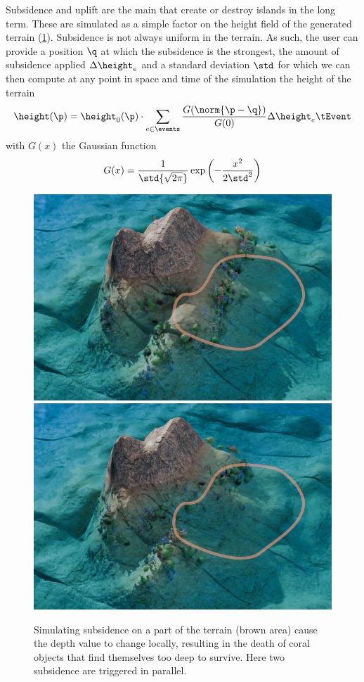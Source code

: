 Subsidence and uplift are the main  that create or destroy islands in the long term. These  are simulated as a simple factor on the height field of the generated terrain (\cref{fig:semantic-representation_subsidence-event}). Subsidence is not always uniform in the terrain. As such, the user can provide a position $\q$ at which the subsidence is the strongest, the amount of subsidence applied $\Delta \height_e$ and a standard deviation $\std$ for which we can then compute at any point in space and time of the simulation the height of the terrain
\begin{align*}
    \height(\p) = \height_0(\p) \cdot \sum_{e \in \events}{\frac{G(\norm{\p - \q})}{G(0)}} \Delta \height_e \tEvent 
\end{align*}
with $G(x)$ the Gaussian function
\begin{align*}
    G(x) = {\frac {1}{\std {\sqrt {2\pi }}}} \exp \left(-\frac {x^{2}}{2 \std ^{2}}\right)
\end{align*}

\begin{figure}
    \includegraphics[width = 0.45 \linewidth]{Figures/Interactions/InteractionSubsidence1.png}
    \includegraphics[width = 0.45 \linewidth]{Figures/Interactions/InteractionSubsidence2.png}
    \caption{Simulating subsidence on a part of the terrain (brown area) cause the depth value to change locally, resulting in the death of coral objects that find themselves too deep to survive. Here two subsidence  are triggered in parallel. }
    \label{fig:semantic-representation_subsidence-event}
\end{figure}

